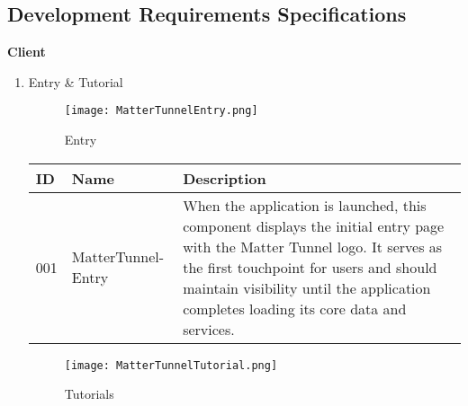 \documentclass[conference]{IEEEtran}
\begin{document}
\subsection{Development Requirements Specifications}
\vspace{1cm}
{\centering \textbf{Client} \par}
\vspace{1cm}

\begin{enumerate}[itemsep=2ex, parsep=1ex]
	\item Entry \& Tutorial
	      
	      \begin{figure}[h!]
	      	\centering
	      	\texttt{[image: MatterTunnelEntry.png]}
	      	\caption{Entry}
	      	\label{fig:MatterTunnelEntry}
	      \end{figure}
          
	      \begin{table}[h!]
	      	\def\arraystretch{1.24} \small
	      	\begin{tabular}{|p{1.2cm}|p{2.5cm}|p{4.0cm}|}
	      		\hline
	      		ID  & Name               & Description                                                                                                                                                                                                                                                  \\
	      		\hline
	      		001 & MatterTunnel-Entry & When the application is launched, this component displays the initial entry page with the Matter Tunnel logo. It serves as the first touchpoint for users and should maintain visibility until the application completes loading its core data and services. \\
	      		\hline
	      	\end{tabular}
	      \end{table}
	      
	      \begin{figure}[h!]
	      	\centering
	      	\texttt{[image: MatterTunnelTutorial.png]}
	      	\caption{Tutorials}
	      	\label{fig:MatterTunnelTutorials}
	      \end{figure}
	                

\end{enumerate}
\end{document}
